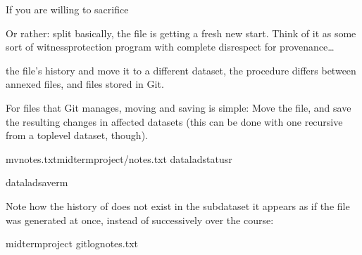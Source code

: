 \sphinxAtStartPar
If you are willing to sacrifice%
\begin{footnote}\sphinxAtStartFootnote
Or rather: split \textendash{} basically, the file is getting a fresh new start.
Think of it as some sort of witness\sphinxhyphen{}protection program with complete
disrespect for provenance…
%
\end{footnote} the file’s history and move it to a
different dataset, the procedure differs between annexed files, and files
stored in Git.

\sphinxAtStartPar
For files that Git manages, moving and saving is simple: Move the file, and
save the resulting changes in  affected datasets (this can be done with
one recursive  from a top\sphinxhyphen{}level dataset, though).

\begin{sphinxVerbatim}[commandchars=\\\{\}]
mvnotes.txtmidterm\PYGZus{}project/notes.txt
dataladstatus\PYGZhy{}r
\end{sphinxVerbatim}

\begin{sphinxVerbatim}[commandchars=\\\{\}]
dataladsave\PYGZhy{}r\PYGZhy{}m
\end{sphinxVerbatim}

\sphinxAtStartPar
Note how the history of  does not exist in the subdataset \textendash{} it appears
as if the file was generated at once, instead of successively over the course:

\begin{sphinxVerbatim}[commandchars=\\\{\}]
midterm\PYGZus{}project
gitlognotes.txt

\end{sphinxVerbatim}

